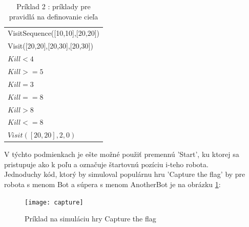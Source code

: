 \begin{table}
\centering
\begin{tabular}{l}
VisitSequence([10,10],[20,20])\\
Visit([20,20],[20,30],[20,30])\\
$Kill < 4$\\
$Kill >= 5$\\
$Kill \!= 3$\\
$Kill == 8$\\
$Kill > 8$\\
$Kill <= 8$\\
$Visit([20,20],2,0)$\\
\end{tabular}
\caption {Príklad 2 : príklady pre pravidlá na definovanie cieľa} %
\label{tab:allVis}
\end{table}

V týchto podmienkach je ešte možné použiť premennú 'Start', ku ktorej sa pristupuje ako k poľu a označuje štartovnú pozíciu i-teho robota.\\
Jednoduchy kód, ktorý by simuloval populárnu hru 'Capture the flag' by pre robota s menom Bot a súpera s menom AnotherBot je na obrázku \ref{fig:capture}:\\
\begin{figure}
\centering
\caption{ Príklad na simuláciu hry Capture the flag }
\texttt{[image: capture]}
\label{fig:capture}
\end{figure}

